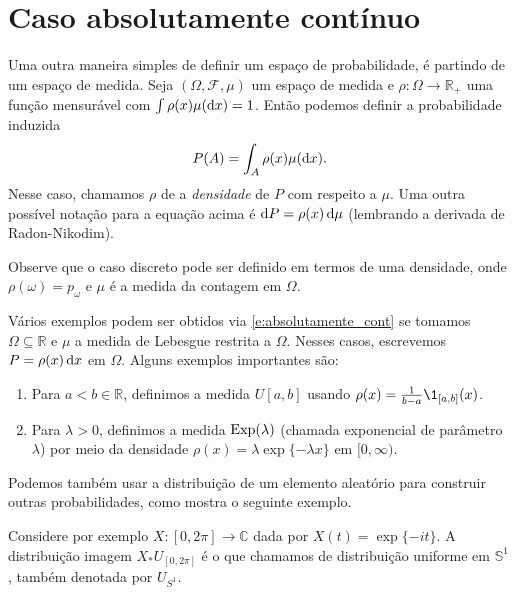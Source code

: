 \vfill
\pagebreak

\section{Caso absolutamente contínuo}

Uma outra maneira simples de definir um espaço de probabilidade, é partindo de um espaço de medida.
Seja $(\Omega, \mathcal{F}, \mu)$ um espaço de medida e $\rho:\Omega \to \mathbb{R}_+$ uma função mensurável com $\int \rho(x) \mu(\mathop{}\!\mathrm{d} x) = 1$.
Então podemos definir a probabilidade induzida
\begin{equation}
  \label{e:absolutamente_cont}
  P(A) = \int_A \rho(x) \mu(\mathop{}\!\mathrm{d} x).
\end{equation}
Nesse caso, chamamos $\rho$ de a \emph{densidade}  de $P$ com respeito a $\mu$.
Uma outra possível notação para a equação acima é $\mathop{}\!\mathrm{d} P = \rho(x) \mathop{}\!\mathrm{d} \mu$  (lembrando a derivada de Radon-Nikodim).

Observe que o caso discreto pode ser definido em termos de uma densidade, onde $\rho(\omega) = p_\omega$ e $\mu$ é a medida da contagem em $\Omega$.

\begin{example}
  Vários exemplos podem ser obtidos via \eqref{e:absolutamente_cont} se tomamos $\Omega \subseteq \mathbb{R}$ e $\mu$ a medida de Lebesgue restrita a $\Omega$.
  Nesses casos, escrevemos $P = \rho(x) \mathop{}\!\mathrm{d} x$ em $\Omega$.
  Alguns exemplos importantes são:
  \begin{enumerate}[\quad a)]
  \item Para $a < b \in \mathbb{R}$, definimos a medida $U[a,b]$  usando $\rho(x) = \tfrac{1}{b-a}\1_{[a,b]}(x)$.
  \item Para $\lambda > 0$, definimos a medida $\operatorname{Exp}(\lambda)$  (chamada exponencial de parâmetro $\lambda$) por meio da densidade $\rho(x) = \lambda \exp\{-\lambda x\}$ em $[0,\infty)$.
  \end{enumerate}
\end{example}

Podemos também usar a distribuição de um elemento aleatório para construir outras probabilidades, como mostra o seguinte exemplo.

\begin{example}
  Considere por exemplo $X:[0,2\pi] \to \mathbb{C}$ dada por $X(t) = \exp\{-i t\}$.
  A distribuição imagem $X_*U_{[0,2\pi]}$ é o que chamamos de distribuição uniforme em $\mathbb{S}^1$, também denotada por $U_{S^1}$.
\end{example}

